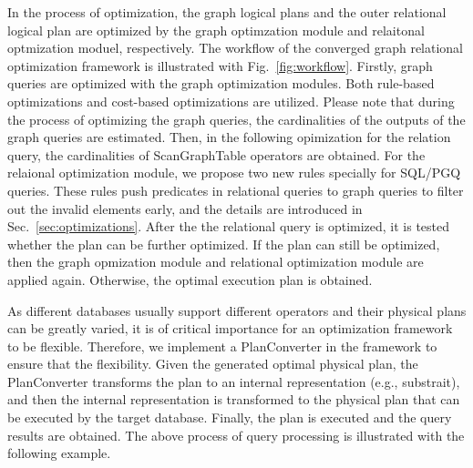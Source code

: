 In the process of optimization, the graph logical plans and the outer relational logical plan are optimized by the graph optimzation module and relaitonal optmization moduel, respectively.
The workflow of the converged graph relational optimization framework is illustrated with Fig.~\ref{fig:workflow}.
Firstly, graph queries are optimized with the graph optimization modules.
Both rule-based optimizations and cost-based optimizations are utilized.
Please note that during the process of optimizing the graph queries, the cardinalities of the outputs of the graph queries are estimated.
Then, in the following opimization for the relation query, the cardinalities of ScanGraphTable operators are obtained.
For the relaional optimization module, we propose two new rules specially for SQL/PGQ queries.
These rules push predicates in relational queries to graph queries to filter out the invalid elements early, and the details are introduced in Sec.~\ref{sec:optimizations}.
After the the relational query is optimized, it is tested whether the plan can be further optimized.
If the plan can still be optimized, then the graph opmization module and relational optimization module are applied again.
Otherwise, the optimal execution plan is obtained.


As different databases usually support different operators and their physical plans can be greatly varied, it is of critical importance for an optimization framework to be flexible.
Therefore, we implement a PlanConverter in the framework to ensure that the flexibility.
Given the generated optimal physical plan, the PlanConverter transforms the plan to an internal representation (e.g., substrait), and then the internal representation is transformed to the physical plan that can be executed by the target database.
Finally, the plan is executed and the query results are obtained.
The above process of query processing is illustrated with the following example.


